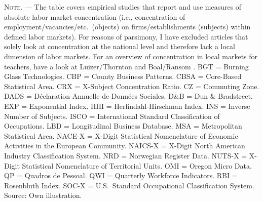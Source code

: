 \documentclass[11pt,oneside,reqno,xcolor=dvipsnames]{article} %
\begin{document}
\begin{appendix}
\begin{refsection}
\begin{landscape}
\begin{table}[!ht]
{\begin{threeparttable}
\begin{tablenotes}
\item  \footnotesize \textsc{Note. ---} The table covers empirical studies that report and use measures of absolute labor market concentration (i.e., concentration of employment/vacancies/etc.\ (objects) on firms/establishments (subjects) within defined labor markets). For reasons of parsimony, I have excluded articles that solely look at concentration at the national level and therefore lack a local dimension of labor markets. For an overview of concentration in local markets for teachers, have a look at Luizer/Thornton \citeyearpar{LuizerThornton1986} and Boal/Ransom \citeyearpar{BoalRansom1997}. BGT = Burning Glass Technologies. CBP = County Business Patterns. CBSA = Core-Based Statistical Area. CRX = X-Subject Concentration Ratio. CZ = Commuting Zone. DADS = D\'{e}claration Annuelle de Donn\'{e}es Sociales. D\&B = Dun \& Bradstreet. EXP = Exponential Index. HHI = Herfindahl-Hirschman Index. INS = Inverse Number of Subjects. ISCO = International Standard Classification of Occupations. LBD = Longitudinal Business Database. MSA = Metropolitan Statistical Area. NACE-X = X-Digit Statistical Nomenclature of Economic Activities in the European Community. NAICS-X = X-Digit North American Industry Classification System. NRD = Norwegian Register Data. NUTS-X = X-Digit Statistical Nomenclature of Territorial Units. OMI = Oregon Micro Data. QP = Quadros de Pessoal. QWI = Quarterly Workforce Indicators. RBI = Rosenbluth Index. SOC-X = U.S.\ Standard Occupational Classification System. Source: Own illustration.
\end{tablenotes}


\end{threeparttable}
}
\end{table}




\clearpage


\begin{table}[!ht]


\centering

\renewcommand{\arraystretch}{1.5}
\end{table}
\end{landscape}
\end{refsection}
\end{appendix}
\end{document}

